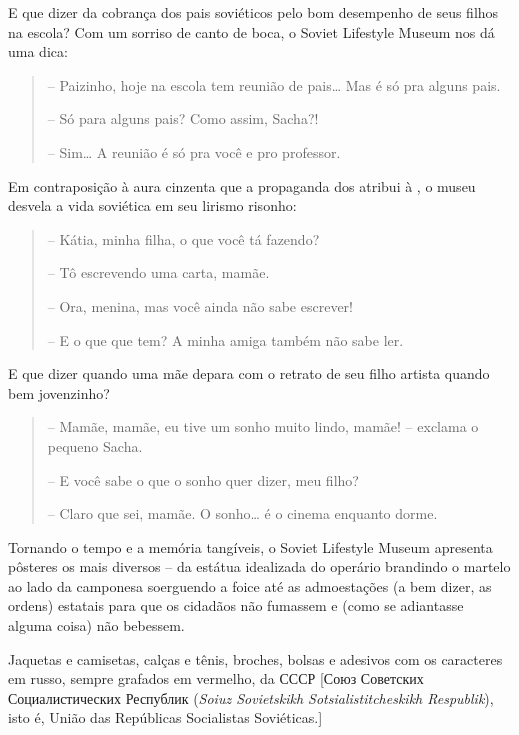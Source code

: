 E que dizer da cobrança dos pais soviéticos pelo bom desempenho de seus
filhos na escola? Com um sorriso de canto de boca, o Soviet Lifestyle
Museum nos dá uma dica:

\begin{quote}
\forceindent{}-- Paizinho, hoje na escola tem reunião de pais\ldots{} Mas é só pra alguns
pais.

-- Só para alguns pais? Como assim, Sacha?!

-- Sim\ldots{} A reunião é só pra você e pro professor.
\end{quote}

Em contraposição à aura cinzenta que a propaganda dos  atribui à
, o museu desvela a vida soviética em seu lirismo risonho:

\begin{quote}
\forceindent{}-- Kátia, minha filha, o que você tá fazendo?

-- Tô escrevendo uma carta, mamãe.

-- Ora, menina, mas você ainda não sabe escrever!

-- E o que que tem? A minha amiga também não sabe ler.
\end{quote}

E que dizer quando uma mãe depara com o retrato de seu filho artista
quando bem jovenzinho?

\begin{quote}
\forceindent{}-- Mamãe, mamãe, eu tive um sonho muito lindo, mamãe! -- exclama o
pequeno Sacha.

-- E você sabe o que o sonho quer dizer, meu filho?

-- Claro que sei, mamãe. O sonho\ldots{} é o cinema enquanto dorme.
\end{quote}

Tornando o tempo e a memória tangíveis, o Soviet Lifestyle Museum
apresenta pôsteres os mais diversos -- da estátua idealizada do operário
brandindo o martelo ao lado da camponesa soerguendo a foice até as
admoestações (a bem dizer, as ordens) estatais para que os cidadãos não
fumassem e (como se adiantasse alguma coisa) não bebessem.

Jaquetas e camisetas, calças e tênis, broches, bolsas e adesivos com os
caracteres em russo, sempre grafados em vermelho, da СССР {[}Союз
Советских Социалистических Республик (\emph{Soiuz Sovietskikh
Sotsialistitcheskikh Respublik}), isto é, União das Repúblicas
Socialistas Soviéticas.{]}

